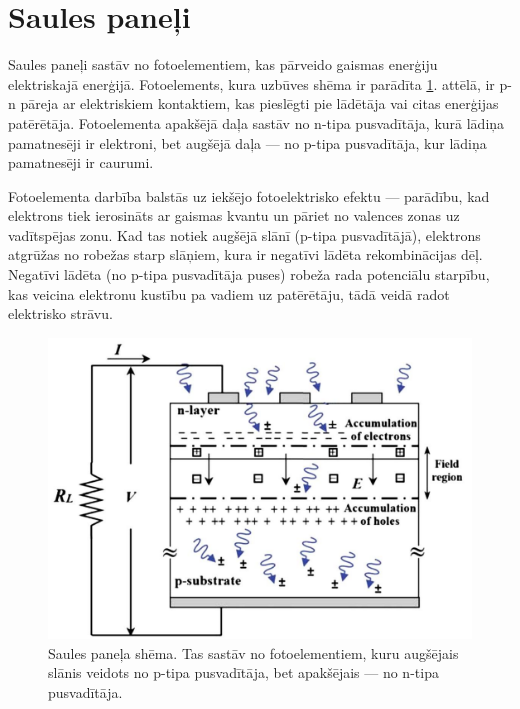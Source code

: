 \section{Saules paneļi}

Saules paneļi sastāv no fotoelementiem, kas pārveido gaismas enerģiju elektriskajā enerģijā. Fotoelements, kura uzbūves shēma ir parādīta \ref{fig:PV}. attēlā, ir p-n pāreja ar elektriskiem kontaktiem, kas pieslēgti pie lādētāja vai citas enerģijas patērētāja. Fotoelementa apakšējā daļa sastāv no n-tipa pusvadītāja, kurā lādiņa pamatnesēji ir elektroni, bet augšējā daļa --- no p-tipa pusvadītāja, kur lādiņa pamatnesēji ir caurumi. 

Fotoelementa darbība balstās uz iekšējo fotoelektrisko efektu --- parādību, kad elektrons tiek ierosināts ar gaismas kvantu un pāriet no valences zonas uz vadītspējas zonu. Kad tas notiek augšējā slānī (p-tipa pusvadītājā), elektrons atgrūžas no robežas starp slāņiem, kura ir negatīvi lādēta rekombinācijas dēļ. Negatīvi lādēta (no p-tipa pusvadītāja puses) robeža rada potenciālu starpību, kas veicina elektronu kustību pa vadiem uz patērētāju, tādā veidā radot elektrisko strāvu.

\begin{figure}[h]
    \centering
    \includegraphics[width=0.6\linewidth]{figures/misc/PV.jpg}
    \caption{Saules paneļa shēma. Tas sastāv no fotoelementiem, kuru augšējais slānis veidots no p-tipa pusvadītāja, bet apakšējais --- no n-tipa pusvadītāja.}
    \label{fig:PV}
\end{figure}

